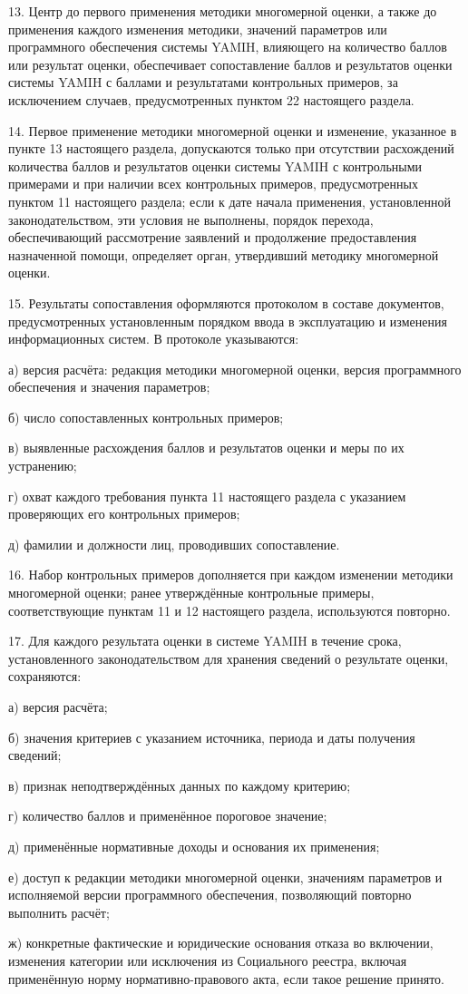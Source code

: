 \documentclass[14pt,a4paper]{extarticle}
\newcommand{\norm}[1]{\par\noindent\hspace*{1.27cm}#1. }
\newcommand{\sub}[1]{\par\noindent\hspace*{1.27cm}#1 }
\begin{document}
\norm{13}Центр до первого применения методики многомерной оценки, а также до применения каждого изменения методики, значений параметров или программного обеспечения системы YAMIH, влияющего на количество баллов или результат оценки, обеспечивает сопоставление баллов и результатов оценки системы YAMIH с баллами и результатами контрольных примеров, за исключением случаев, предусмотренных пунктом 22 настоящего раздела.

\norm{14}Первое применение методики многомерной оценки и изменение, указанное в пункте 13 настоящего раздела, допускаются только при отсутствии расхождений количества баллов и результатов оценки системы YAMIH с контрольными примерами и при наличии всех контрольных примеров, предусмотренных пунктом 11 настоящего раздела; если к дате начала применения, установленной законодательством, эти условия не выполнены, порядок перехода, обеспечивающий рассмотрение заявлений и продолжение предоставления назначенной помощи, определяет орган, утвердивший методику многомерной оценки.

\norm{15}Результаты сопоставления оформляются протоколом в составе документов, предусмотренных установленным порядком ввода в эксплуатацию и изменения информационных систем. В протоколе указываются:
\sub{а)}версия расчёта: редакция методики многомерной оценки, версия программного обеспечения и значения параметров;
\sub{б)}число сопоставленных контрольных примеров;
\sub{в)}выявленные расхождения баллов и результатов оценки и меры по их устранению;
\sub{г)}охват каждого требования пункта 11 настоящего раздела с указанием проверяющих его контрольных примеров;
\sub{д)}фамилии и должности лиц, проводивших сопоставление.

\norm{16}Набор контрольных примеров дополняется при каждом изменении методики многомерной оценки; ранее утверждённые контрольные примеры, соответствующие пунктам 11 и 12 настоящего раздела, используются повторно.

\norm{17}Для каждого результата оценки в системе YAMIH в течение срока, установленного законодательством для хранения сведений о результате оценки, сохраняются:
\sub{а)}версия расчёта;
\sub{б)}значения критериев с указанием источника, периода и даты получения сведений;
\sub{в)}признак неподтверждённых данных по каждому критерию;
\sub{г)}количество баллов и применённое пороговое значение;
\sub{д)}применённые нормативные доходы и основания их применения;
\sub{е)}доступ к редакции методики многомерной оценки, значениям параметров и исполняемой версии программного обеспечения, позволяющий повторно выполнить расчёт;
\sub{ж)}конкретные фактические и юридические основания отказа во включении, изменения категории или исключения из Социального реестра, включая применённую норму нормативно-правового акта, если такое решение принято.
\end{document}
